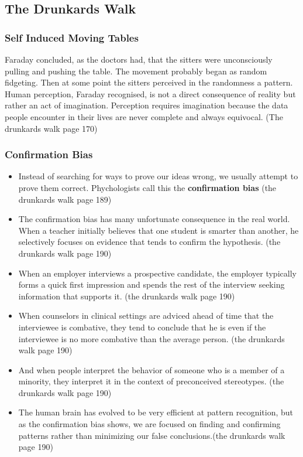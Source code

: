 \documentclass[11pt]{article}
\begin{document}
\subsection{The Drunkards Walk}
\subsubsection{Self Induced Moving Tables}
Faraday concluded, as the doctors had, that the sitters were unconsciously pulling and pushing the table. The movement probably began as random fidgeting. Then at some point the sitters perceived in the randomness a pattern. Human perception, Faraday recognised, is not a direct consequence of reality but rather an act of imagination. Perception requires imagination because the data people encounter in their lives are never complete and always equivocal. (The drunkards walk page 170)

\subsubsection{Confirmation Bias}
\begin{itemize}
 \item {
       Instead of searching for ways to prove our ideas wrong, we usually attempt to prove them correct. Phychologists call this the \textbf{confirmation bias} (the drunkards walk page 189)
       }
       \item{
                   The confirmation bias has many unfortunate consequence in the real world. When a teacher initially believes that one student is smarter than another, he selectively focuses on evidence that tends to confirm the hypothesis. (the drunkards walk page 190)
             }
 \item {
       When an employer interviews a prospective candidate, the employer typically forms a quick first impression and spends the rest of the interview seeking information that supports it. (the drunkards walk page 190)
       }
 \item {
       When counselors in clinical settings are adviced ahead of time that the interviewee is combative, they tend to conclude that he is even if the interviewee is no more combative than the average person.  (the drunkards walk page 190)
       }
       \item{
                   And when people interpret the behavior of someone who is a member of a minority, they interpret it in the context of preconceived stereotypes. (the drunkards walk page 190)
             }
 \item {
       The human brain has evolved to be very efficient at pattern recognition, but as the confirmation bias shows, we are focused on finding and confirming patterns rather than minimizing our false conclusions.(the drunkards walk page 190)
       }
\end{itemize}
\end{document}
